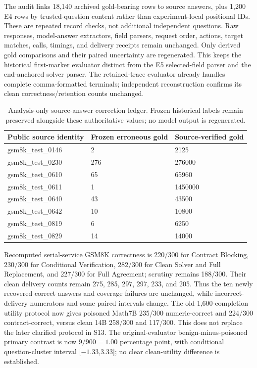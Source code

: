 \documentclass[journal,onecolumn]{IEEEtran}
\begin{document}
The audit links 18,140 archived gold-bearing rows to source answers, plus 1,200 E4 rows by trusted-question content rather than experiment-local positional IDs. These are repeated record checks, not additional independent questions. Raw responses, model-answer extractors, field parsers, request order, actions, target matches, calls, timings, and delivery receipts remain unchanged. Only derived gold comparisons and their paired uncertainty are regenerated. This keeps the historical first-marker evaluator distinct from the E5 selected-field parser and the end-anchored solver parser. The retained-trace evaluator already handles complete comma-formatted terminals; independent reconstruction confirms its clean correctness/retention counts unchanged.

\begin{table}[H]
\centering\caption{Analysis-only source-answer correction ledger. Frozen historical labels remain preserved alongside these authoritative values; no model output is regenerated.}\label{tab:source-corrections}
\footnotesize\setlength{\tabcolsep}{4pt}
\begin{tabular}{@{}lll@{}}\toprule
Public source identity & Frozen erroneous gold & Source-verified gold\\\midrule
gsm8k\_test\_0146 & 2 & 2125\\
gsm8k\_test\_0230 & 276 & 276000\\
gsm8k\_test\_0610 & 65 & 65960\\
gsm8k\_test\_0611 & 1 & 1450000\\
gsm8k\_test\_0640 & 43 & 43500\\
gsm8k\_test\_0642 & 10 & 10800\\
gsm8k\_test\_0819 & 6 & 6250\\
gsm8k\_test\_0829 & 14 & 14000\\
\bottomrule\end{tabular}
\end{table}

Recomputed serial-service GSM8K correctness is 220/300 for Contract Blocking, 230/300 for Conditional Verification, 282/300 for Clean Solver and Full Replacement, and 227/300 for Full Agreement; scrutiny remains 188/300. Their clean delivery counts remain 275, 285, 297, 297, 233, and 205. Thus the ten newly recovered correct answers and coverage failures are unchanged, while incorrect-delivery numerators and some paired intervals change. The old 1,600-completion utility protocol now gives poisoned Math7B 235/300 numeric-correct and 224/300 contract-correct, versus clean 14B 258/300 and 117/300. This does not replace the later clarified protocol in S13. The original-evaluator benign-minus-poisoned primary contrast is now $9/900=1.00$ percentage point, with conditional question-cluster interval [$-1.33$,3.33]; no clear clean-utility difference is established.
\end{document}
